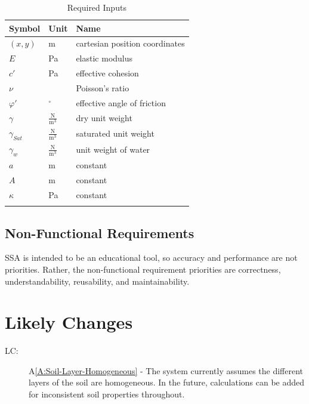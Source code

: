 \documentclass[12pt]{article}
\newcounter{lcnum}
\newcommand{\lcthelcnum}{LC\thelcnum}
\begin{document}
\begin{longtable}{l l l}
\toprule
Symbol & Unit & Name
\\
\midrule
$(x,y)$ & m & cartesian position coordinates
\\
$E$ & Pa & elastic modulus
\\
$c'$ & Pa & effective cohesion
\\
$ν$ &  & Poisson's ratio
\\
$φ'$ & ${}^{\circ}$ & effective angle of friction
\\
$γ$ & $\frac{\text{N}}{\text{m}^{3}}$ & dry unit weight
\\
${γ_{Sat}}$ & $\frac{\text{N}}{\text{m}^{3}}$ & saturated unit weight
\\
${γ_{w}}$ & $\frac{\text{N}}{\text{m}^{3}}$ & unit weight of water
\\
$a$ & m & constant
\\
$A$ & m & constant
\\
$κ$ & Pa & constant
\\
\bottomrule
\caption{Required Inputs}
\label{Table:inDataTable}
\end{longtable}
\subsection{Non-Functional Requirements}
\label{Sec:NFRs}
SSA is intended to be an educational tool, so accuracy and performance are not priorities. Rather, the non-functional requirement priorities are correctness, understandability, reusability, and maintainability.
\section{Likely Changes}
\label{Sec:LCs}
\begin{description}
\item[\lcthelcnum\label{LC:LC.inhomogeneous}:]A\ref{A:Soil-Layer-Homogeneous} - The system currently assumes the different layers of the soil are homogeneous. In the future, calculations can be added for inconsistent soil properties throughout.
\end{description}
\end{document}

